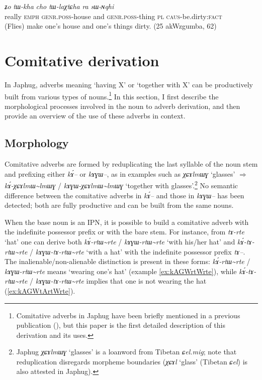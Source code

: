 \documentclass[oldfontcommands,oneside,a4paper,11pt]{article}
\newcommand{\ipa}[1]{{\phon\textit{#1}}} %
\newcommand{\tld}{\textasciitilde{}}
\begin{document}
\begin{exe}
\ex \label{ex:tWlaXtCha}
\gll  \ipa{wuma}  	\ipa{ʑo}  	\ipa{tɯ-kha}  	\ipa{cho}  	\ipa{tɯ-laχtɕha}  	\ipa{ra}  	\ipa{sɯ-ɴqhi}  \\
really \textsc{emph} \textsc{genr.poss}-house and \textsc{genr.poss}-thing \textsc{pl} \textsc{caus}-be.dirty:\textsc{fact} \\
\glt (Flies) make one's house and one's things dirty. (25 akWzgumba, 62)
\end{exe}


 
 \section{Comitative derivation} 
In Japhug, adverbs meaning `having X' or `together with X' can be productively built from various types of nouns.\footnote{Comitative adverbs in Japhug have been briefly mentioned in a previous publication (\citealt[51]{jacques08}), but this paper is the first detailed description of this derivation and its uses.} In this section, I first describe the morphological processes involved in the noun to adverb derivation, and then provide an overview of the use of these adverbs in context.

\subsection{Morphology}
Comitative adverbs are formed by reduplicating the last syllable of the noun stem and prefixing either \ipa{kɤ́--} or \ipa{kɤɣɯ--}, as in examples such as \ipa{χɕɤlmɯɣ} `glasses' $\Rightarrow$ \ipa{kɤ́-χɕɤlmɯ\tld{}lmɯɣ} / \ipa{kɤɣɯ-χɕɤlmɯ\tld{}lmɯɣ} `together with glasses'.\footnote{Japhug \ipa{χɕɤlmɯɣ} `glasses' is a loanword from Tibetan \ipa{ɕel.mig}; note that reduplication disregards morpheme boundaries (\ipa{χɕɤl} `glass' (Tibetan \ipa{ɕel}) is also attested in Japhug). } No semantic difference between the comitative adverbs in \ipa{kɤ́--} and those in \ipa{kɤɣɯ--} has been detected; both are fully productive and can be built from the same nouns.

When the base noun is an IPN, it is possible to build a comitative adverb with the indefinite possessor prefix or with the bare stem. For instance, from \ipa{tɤ-rte} `hat' one can derive both \ipa{kɤ́-rtɯ\tld{}rte} / \ipa{kɤɣɯ-rtɯ\tld{}rte} `with his/her hat' and \ipa{kɤ́-tɤ-rtɯ\tld{}rte} /  \ipa{kɤɣɯ-tɤ-rtɯ\tld{}rte} `with a hat' with the indefinite possessor prefix \ipa{tɤ--}. The inalienable/non-alienable distinction is present in these forms: \ipa{kɤ́-rtɯ\tld{}rte} / \ipa{kɤɣɯ-rtɯ\tld{}rte} means `wearing one's hat' (example \ref{ex:kAGWrtWrte}), while \ipa{kɤ́-tɤ-rtɯ\tld{}rte} /  \ipa{kɤɣɯ-tɤ-rtɯ\tld{}rte} implies that one is not wearing the hat (\ref{ex:kAGWtArtWrte}).
\end{document}
